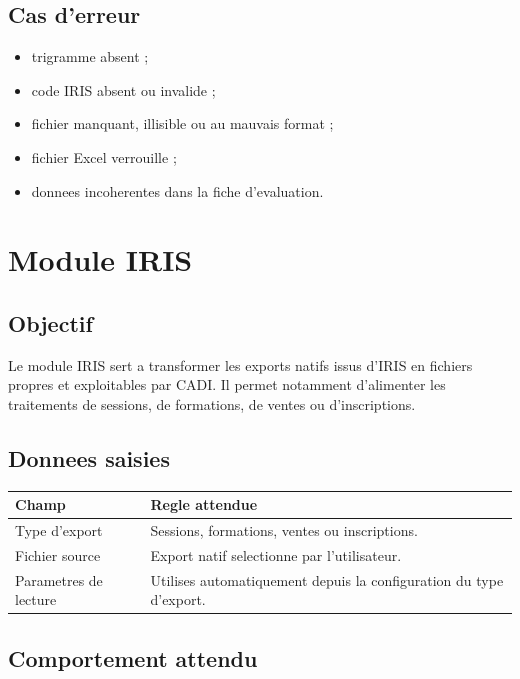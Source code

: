 \documentclass[11pt,a4paper]{report}
\begin{document}
\section{Cas d'erreur}

\begin{itemize}
  \item trigramme absent ;
  \item code IRIS absent ou invalide ;
  \item fichier manquant, illisible ou au mauvais format ;
  \item fichier Excel verrouille ;
  \item donnees incoherentes dans la fiche d'evaluation.
\end{itemize}

\chapter{Module IRIS}

\section{Objectif}

Le module IRIS sert a transformer les exports natifs issus d'IRIS en fichiers propres et exploitables par CADI. Il permet notamment d'alimenter les traitements de sessions, de formations, de ventes ou d'inscriptions.

\section{Donnees saisies}

\begin{longtable}{L{5cm} L{9cm}}
\toprule
{}
\textbf{Champ} & \textbf{Regle attendue} \\
\midrule
Type d'export & Sessions, formations, ventes ou inscriptions. \\
Fichier source & Export natif selectionne par l'utilisateur. \\
Parametres de lecture & Utilises automatiquement depuis la configuration du type d'export. \\
\bottomrule
\end{longtable}

\section{Comportement attendu}
\end{document}
